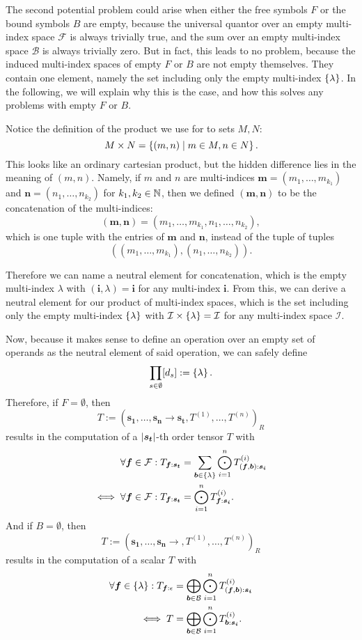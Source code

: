 The second potential problem could arise when either the free symbols $F$ or the bound symbols $B$ are empty,
because the universal quantor over an empty multi-index space $\mathcal{F}$ is always trivially true, and the sum over an empty multi-index space $\mathcal{B}$ is always trivially zero.
But in fact, this leads to no problem, because the induced multi-index spaces of empty $F$ or $B$ are not empty themselves.
They contain one element, namely the set including only the empty multi-index $\lbrace \lambda \rbrace$.
In the following, we will explain why this is the case, and how this solves any problems with empty $F$ or $B$.

Notice the definition of the product we use for to sets $M, N$:
$$M \times N = \left\lbrace (m, n) \mid m \in M, n \in N \right\rbrace.$$
This looks like an ordinary cartesian product, but the hidden difference lies in the meaning of $(m,n)$.
Namely, if $m$ and $n$ are multi-indices $\bm{m} = (m_1, \dots, m_{k_1})$ and $\bm{n} = (n_1, \dots, n_{k_2})$ for $k_1, k_2 \in \mathbb{N}$, then we defined $(\bm{m}, \bm{n})$ to be the concatenation of the multi-indices:
$$(\bm{m}, \bm{n}) = (m_1, \dots, m_{k_1}, n_1, \dots, n_{k_2}),$$
which is one tuple with the entries of $\bm{m}$ and $\bm{n}$, instead of the tuple of tuples
$$((m_1, \dots, m_{k_1}), (n_1, \dots, n_{k_2})).$$

Therefore we can name a neutral element for concatenation, which is the empty multi-index $\lambda$ with $(\bm{i}, \lambda) = \bm{i}$ for any multi-index $\bm{i}$.
From this, we can derive a neutral element for our product of multi-index spaces, which is the set including only the empty multi-index $\lbrace \lambda \rbrace$ with $\mathcal{I} \times \lbrace \lambda \rbrace = \mathcal{I}$ for any multi-index space $\mathcal{I}$.

Now, because it makes sense to define an operation over an empty set of operands as the neutral element of said operation, we can safely define
$$\prod\limits_{s \in \emptyset} [d_s] := \left\lbrace \lambda \right\rbrace.$$
Therefore, if $F = \emptyset$, then
$$T := (\bm{s_1},\dots,\bm{s_n} \rightarrow \bm{s_t}, T^{(1)},\dots,T^{(n)})_R$$
results in the computation of a $\left\lvert \bm{s_t} \right\rvert$-th order tensor $T$ with
\begin{align*}
    \forall \bm{f} \in \mathcal{F}: T_{\bm{f}: \bm{s_t}}      & = \sum\limits_{\bm{b} \in \lbrace \lambda \rbrace} \bigodot\limits_{i = 1}^{n} T^{(i)}_{(\bm{f},\bm{b}):\bm{s_i}} \\
    \iff \forall \bm{f} \in \mathcal{F}: T_{\bm{f}: \bm{s_t}} & = \bigodot\limits_{i = 1}^{n} T^{(i)}_{\bm{f}:\bm{s_i}}.
\end{align*}
And if $B = \emptyset$, then
$$T := (\bm{s_1},\dots,\bm{s_n} \rightarrow , T^{(1)},\dots,T^{(n)})_R$$
results in the computation of a scalar $T$ with
\begin{align*}
    \forall \bm{f} \in \lbrace \lambda \rbrace: T_{\bm{f}: \epsilon} & = \bigoplus\limits_{\bm{b} \in \mathcal{B}} \bigodot\limits_{i = 1}^{n} T^{(i)}_{(\bm{f},\bm{b}):\bm{s_i}} \\
    \iff T                                                      & = \bigoplus\limits_{\bm{b} \in \mathcal{B}} \bigodot\limits_{i = 1}^{n} T^{(i)}_{\bm{b}:\bm{s_i}}.
\end{align*}

